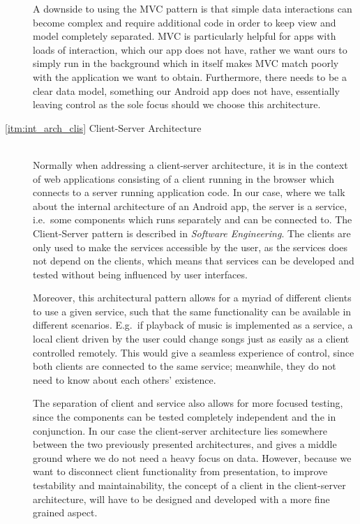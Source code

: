 \begin{description}
A downside to using the MVC pattern is that simple data interactions can become complex and require additional code in order to keep view and model completely separated.
MVC is particularly helpful for apps with loads of interaction, which our app does not have, rather we want ours to simply run in the background which in itself makes MVC match poorly with the application we want to obtain.
Furthermore, there needs to be a clear data model, something our Android app does not have, essentially leaving control as the sole focus should we choose this architecture.

\item[\ref{itm:int_arch_clis} Client-Server Architecture]\hfill\\
Normally when addressing a client-server architecture, it is in the context of web applications consisting of a client running in the browser which connects to a server running application code.
In our case, where we talk about the internal architecture of an Android app, the server is a service, i.e.~some components which runs separately and can be connected to.
The Client-Server pattern is described in \textit{Software Engineering}\cite[p. 180-181]{sommerville}.
The clients are only used to make the services accessible by the user, as the services does not depend on the clients, which means that services can be developed and tested without being influenced by user interfaces.

Moreover, this architectural pattern allows for a myriad of different clients to use a given service, such that the same functionality can be available in different scenarios.
E.g.~if playback of music is implemented as a service, a local client driven by the user could change songs just as easily as a client controlled remotely.
This would give a seamless experience of control, since both clients are connected to the same service; meanwhile, they do not need to know about each others' existence.

The separation of client and service also allows for more focused testing, since the components can be tested completely independent and the in conjunction.
In our case the client-server architecture lies somewhere between the two previously presented architectures, and gives a middle ground where we do not need a heavy focus on data.
However, because we want to disconnect client functionality from presentation, to improve testability and maintainability, the concept of a client in the client-server architecture, will have to be designed and developed with a more fine grained aspect.
\end{description}
